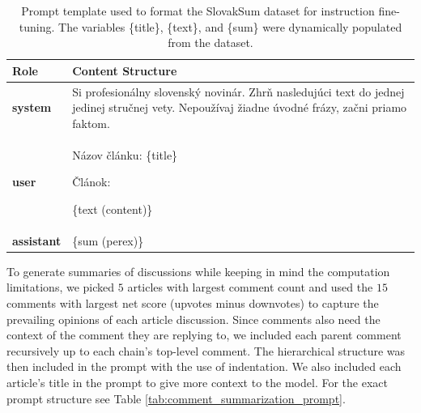 \documentclass[11pt,a4paper]{article}
\begin{document}
\vspace{1em}

\begin{table}[H]
	\centering
	\small
	\begin{tabular}{@{}lp{12cm}@{}}
		\toprule
		\textbf{Role}      & \textbf{Content Structure}                                                                                                                      \\ \midrule
		\textbf{system}    & Si profesionálny slovenský novinár. Zhrň nasledujúci text do jednej jedinej stručnej vety. Nepoužívaj žiadne úvodné frázy, začni priamo faktom. \\ \midrule
		\textbf{user}      & \raggedright\arraybackslash Názov článku: \{title\} \par\vspace{0.5em} Článok: \par \{text (content)\}                                          \\ \midrule
		\textbf{assistant} & \{sum (perex)\}                                                                                                                                 \\ \bottomrule
	\end{tabular}
	\caption{Prompt template used to format the SlovakSum dataset for instruction fine-tuning. The variables \{title\}, \{text\}, and \{sum\} were dynamically populated from the dataset.}
	\label{tab:summarization_prompt}
\end{table}

To generate summaries of discussions while keeping in mind the computation limitations, we picked $5$ articles with largest comment count and used the $15$ comments with largest net score (upvotes minus downvotes) to capture the prevailing opinions of each article discussion. Since comments also need the context of the comment they are replying to, we included each parent comment recursively up to each chain's top-level comment. The hierarchical structure was then included in the prompt with the use of indentation. We also included each article's title in the prompt to give more context to the model. For the exact prompt structure see Table \ref{tab:comment_summarization_prompt}.
\end{document}
